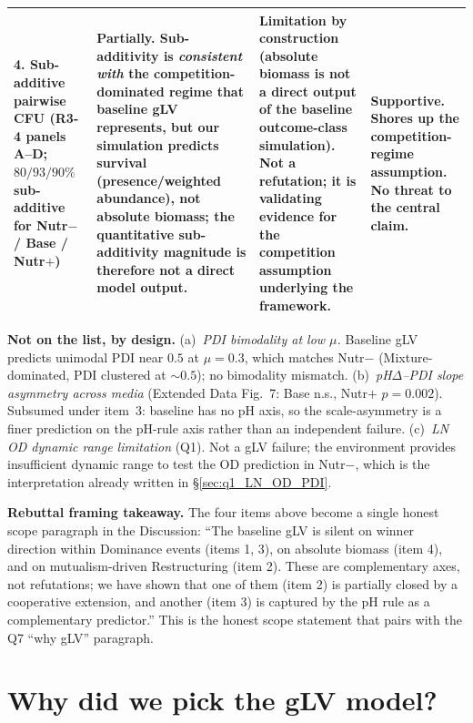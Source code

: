 \documentclass[11pt]{article}
\begin{document}
\begin{center}
\begin{tabular}{p{} p{} p{} p{}}
\textbf{4. Sub-additive pairwise CFU} \newline (R3-4 panels A--D; $80/93/90\%$ sub-additive for Nutr$-$ / Base / Nutr$+$) &
Partially. Sub-additivity is \emph{consistent with} the competition-dominated regime that baseline gLV represents, but our simulation predicts survival (presence/weighted abundance), not absolute biomass; the quantitative sub-additivity magnitude is therefore not a direct model output. &
Limitation by construction (absolute biomass is not a direct output of the baseline outcome-class simulation). Not a refutation; it is validating evidence for the competition assumption underlying the framework. &
Supportive. Shores up the competition-regime assumption. No threat to the central claim. \\
\bottomrule
\end{tabular}
\end{center}

\noindent\textbf{Not on the list, by design.}
(a)~\emph{PDI bimodality at low $\mu$.} Baseline gLV predicts unimodal PDI near $0.5$ at $\mu = 0.3$, which matches Nutr$-$ (Mixture-dominated, PDI clustered at $\sim 0.5$); no bimodality mismatch.
(b)~\emph{pH$\Delta$--PDI slope asymmetry across media} (Extended Data Fig.~7: Base n.s., Nutr$+$ $p = 0.002$). Subsumed under item~3: baseline has no pH axis, so the scale-asymmetry is a finer prediction on the pH-rule axis rather than an independent failure.
(c)~\emph{LN OD dynamic range limitation} (Q1). Not a gLV failure; the environment provides insufficient dynamic range to test the OD prediction in Nutr$-$, which is the interpretation already written in \S\ref{sec:q1_LN_OD_PDI}.

\noindent\textbf{Rebuttal framing takeaway.} The four items above become a single honest scope paragraph in the Discussion: ``The baseline gLV is silent on winner direction within Dominance events (items 1, 3), on absolute biomass (item 4), and on mutualism-driven Restructuring (item 2). These are complementary axes, not refutations; we have shown that one of them (item 2) is partially closed by a cooperative extension, and another (item 3) is captured by the pH rule as a complementary predictor.'' This is the honest scope statement that pairs with the Q7 ``why gLV'' paragraph.

\section{Why did we pick the gLV model?}
\label{sec:q7_why_gLV}
\end{document}
